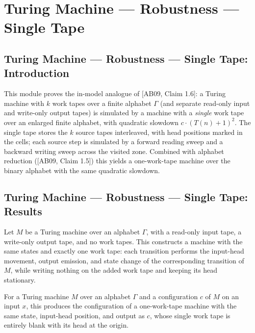 \section{Turing Machine --- Robustness --- Single Tape}
\subsection*{Turing Machine --- Robustness --- Single Tape: Introduction}

This module proves the in-model analogue of [AB09, Claim 1.6]: a Turing machine with $k$
work tapes over a finite alphabet $\Gamma$ (and separate read-only input and write-only
output tapes) is simulated by a machine with a \emph{single} work tape over an enlarged
finite alphabet, with quadratic slowdown $c \cdot (T(n)+1)^2$. The single tape stores the
$k$ source tapes interleaved, with head positions marked in the cells; each source step
is simulated by a forward reading sweep and a backward writing sweep across the visited
zone. Combined with alphabet reduction ([AB09, Claim 1.5]) this yields a one-work-tape
machine over the binary alphabet with the same quadratic slowdown.

\subsection*{Turing Machine --- Robustness --- Single Tape: Results}

\begin{definition}
\label{Turing.FinTM.unusedTapeTM}
\leanok
{}
Let $M$ be a Turing machine over an alphabet $\Gamma$, with a read-only input tape, a
write-only output tape, and no work tapes. This constructs a machine with the same
states and exactly one work tape: each transition performs the input-head movement,
output emission, and state change of the corresponding transition of $M$, while writing
nothing on the added work tape and keeping its head stationary.
\end{definition}

\begin{definition}
\label{Turing.FinTM.unusedTapeCfg}
\leanok
{}
For a Turing machine $M$ over an alphabet $\Gamma$ and a configuration $c$ of $M$ on an
input $x$, this produces the configuration of a one-work-tape machine with the same
state, input-head position, and output as $c$, whose single work tape is entirely blank
with its head at the origin.
\end{definition}

